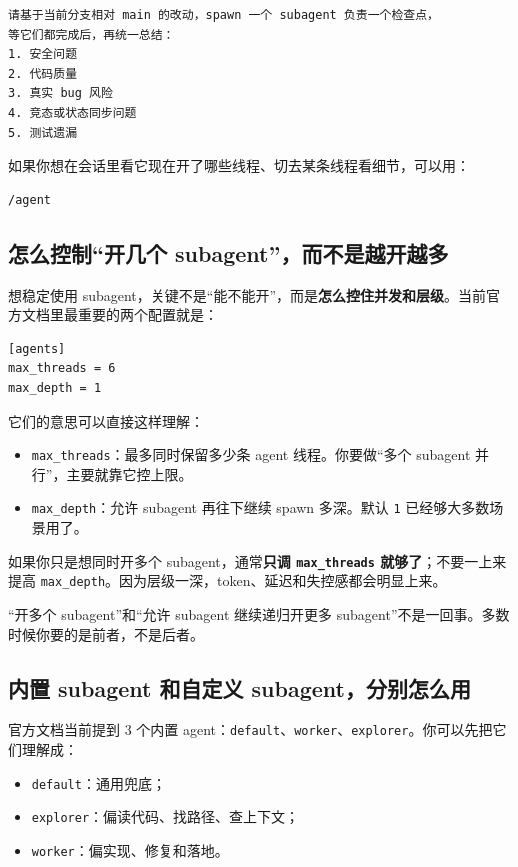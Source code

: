 \documentclass[UTF8,a4paper,12pt]{ctexart}
\begin{document}
\begin{lstlisting}[style=prompt]
请基于当前分支相对 main 的改动，spawn 一个 subagent 负责一个检查点，
等它们都完成后，再统一总结：
1. 安全问题
2. 代码质量
3. 真实 bug 风险
4. 竞态或状态同步问题
5. 测试遗漏
\end{lstlisting}

如果你想在会话里看它现在开了哪些线程、切去某条线程看细节，可以用：

\begin{lstlisting}[style=cli]
/agent
\end{lstlisting}

\subsection{怎么控制“开几个 subagent”，而不是越开越多}

想稳定使用 subagent，关键不是“能不能开”，而是\textbf{怎么控住并发和层级}。当前官方文档里最重要的两个配置就是：

\begin{lstlisting}[style=cli]
[agents]
max_threads = 6
max_depth = 1
\end{lstlisting}

它们的意思可以直接这样理解：
\begin{itemize}
  \item \texttt{max\_threads}：最多同时保留多少条 agent 线程。你要做“多个 subagent 并行”，主要就靠它控上限。
  \item \texttt{max\_depth}：允许 subagent 再往下继续 spawn 多深。默认 \texttt{1} 已经够大多数场景用了。
\end{itemize}

如果你只是想同时开多个 subagent，通常\textbf{只调 \texttt{max\_threads} 就够了}；不要一上来提高 \texttt{max\_depth}。因为层级一深，token、延迟和失控感都会明显上来。

\begin{warnbox}
“开多个 subagent”和“允许 subagent 继续递归开更多 subagent”不是一回事。多数时候你要的是前者，不是后者。
\end{warnbox}

\subsection{内置 subagent 和自定义 subagent，分别怎么用}

官方文档当前提到 3 个内置 agent：\texttt{default}、\texttt{worker}、\texttt{explorer}。你可以先把它们理解成：
\begin{itemize}
  \item \texttt{default}：通用兜底；
  \item \texttt{explorer}：偏读代码、找路径、查上下文；
  \item \texttt{worker}：偏实现、修复和落地。
\end{itemize}
\end{document}

